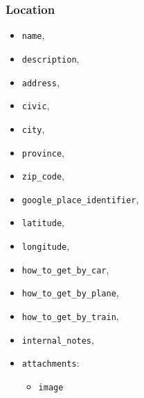 \subsubsection{Location}
\begin{itemize}
	\item \verb|name|,
	\item \verb|description|,
	\item \verb|address|,
	\item \verb|civic|,
	\item \verb|city|,
	\item \verb|province|,
	\item \verb|zip_code|,
	\item \verb|google_place_identifier|,
	\item \verb|latitude|,
	\item \verb|longitude|,
	\item \verb|how_to_get_by_car|,
	\item \verb|how_to_get_by_plane|,
	\item \verb|how_to_get_by_train|,
	\item \verb|internal_notes|,
	\item \verb|attachments|:
	\begin{itemize}
		\item \verb|image|
	\end{itemize}
\end{itemize}

